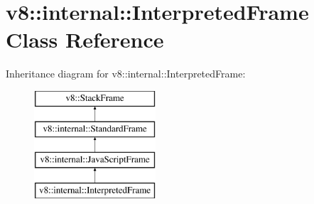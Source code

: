 \hypertarget{classv8_1_1internal_1_1_interpreted_frame}{}\section{v8\+:\+:internal\+:\+:Interpreted\+Frame Class Reference}
\label{classv8_1_1internal_1_1_interpreted_frame}
Inheritance diagram for v8\+:\+:internal\+:\+:Interpreted\+Frame\+:\begin{figure}[H]
\begin{center}
\leavevmode
\includegraphics[height=4.000000cm]{classv8_1_1internal_1_1_interpreted_frame}
\end{center}
\end{figure}
